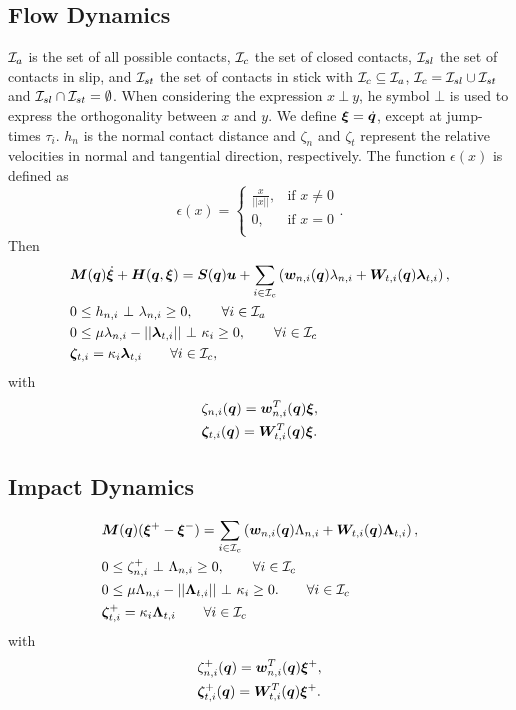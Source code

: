 \documentclass[DC2017114Bouma.tex]{subfiles}
\begin{document}
\subsection*{Flow Dynamics}
$\mathcal{I}_a$ is the set of all possible contacts, $\mathcal{I}_c$ the set of closed contacts, $\mathcal{I}_{sl}$ the set of contacts in slip, and $\mathcal{I}_{st}$ the set of contacts in stick with $\mathcal{I}_c\subseteq \mathcal{I}_a$, $\mathcal{I}_c = \mathcal{I}_{sl}\cup \mathcal{I}_{st}$ and $\mathcal{I}_{sl}\cap \mathcal{I}_{st} = \emptyset$. When considering the expression $x\ \bot\ y$, he symbol $\bot$ is used to express the orthogonality between $x$ and $y$. We define $\boldsymbol{\xi}=\dot{{\boldsymbol{q}}}$, except at jump-times $\tau_i$. $h_n$ is the normal contact distance and $\zeta_{n}$ and $\zeta_{t}$ represent the relative velocities in normal and tangential direction,  respectively. The function $\epsilon(x)$ is defined as 
\begin{equation}
\epsilon(x) = \left\lbrace\begin{array}{rr}
\frac{x}{||x||}, & \text{if } x \neq 0\\
0, & \text{if } x = 0\\
\end{array}\right. .\label{eq:epsilon}
\end{equation}
Then
\begin{align}
&{\boldsymbol{M}}({\boldsymbol{q}})\dot{\boldsymbol{\xi}} + {\boldsymbol{H}}({\boldsymbol{q}},\boldsymbol{\xi}) = {\boldsymbol{S}}({\boldsymbol{q}}){\boldsymbol{u}} + \sum_{i\in\mathcal{I}_c}\left({\boldsymbol{w}}_{n,i}({\boldsymbol{q}})\lambda_{n,i} + {\boldsymbol{W}}_{t,i}({\boldsymbol{q}})\boldsymbol{\lambda}_{t,i} \right), \label{eq:ncpcontact1}\\
&0\leq h_{n,i}\ \bot\ \lambda_{n,i} \geq 0, \qquad \forall i\in\mathcal{I}_a\label{eq:ncpcontact2}\\
&0\leq \mu\lambda_{n,i} - ||\boldsymbol{\lambda}_{t,i}||\ \bot\ \kappa_i \geq 0, \qquad \forall i\in\mathcal{I}_c\label{eq:ncpcontact3}\\
&\boldsymbol{\zeta}_{t,i} = \kappa_i\boldsymbol{\lambda}_{t,i} \qquad \forall i \in \mathcal{I}_c,\label{eq:ncpcontact4}
\end{align}
with 
\begin{align}
&\zeta_{n,i}({\boldsymbol{q}}) = {\boldsymbol{w}}^T_{n,i}({\boldsymbol{q}}) \boldsymbol{\xi},  \label{eq:zetan}\\
&\boldsymbol{\zeta}_{t,i}({\boldsymbol{q}}) = {\boldsymbol{W}}^T_{t,i}({\boldsymbol{q}}) \boldsymbol{\xi}. \label{eq:zetab}
\end{align}
\subsection*{Impact Dynamics}
\begin{align}
&{\boldsymbol{M}}({\boldsymbol{q}})(\boldsymbol{\xi}^+ - \boldsymbol{\xi}^-) = \sum_{i\in\mathcal{I}_c}\left( {\boldsymbol{w}}_{n,i}({\boldsymbol{q}})\Lambda_{n,i} + {\boldsymbol{W}}_{t,i}({\boldsymbol{q}})\boldsymbol{\Lambda}_{t,i}\right), \label{eq:ncpimpact1}\\
&0\leq \zeta_{n,i}^+\ \bot\ \Lambda_{n,i} \geq 0, \qquad \forall i\in\mathcal{I}_c\label{eq:ncpimpact2}\\
&0 \leq \mu\Lambda_{n,i} - ||\boldsymbol{\Lambda}_{t,i}||\ \bot\ \kappa_i \geq 0. \qquad \forall i\in\mathcal{I}_c\label{eq:ncpimpact3}\\
&\boldsymbol{\zeta}_{t,i}^+ = \kappa_i\boldsymbol{\Lambda}_{t,i}\qquad \forall i\in\mathcal{I}_c\label{eq:ncpimpact4}
\end{align}
with 
\begin{align}
&\zeta^+_{n,i}({\boldsymbol{q}}) = {\boldsymbol{w}}^T_{n,i}({\boldsymbol{q}}) \boldsymbol{\xi}^+,\\
&\boldsymbol{\zeta}^+_{t,i}({\boldsymbol{q}}) = {\boldsymbol{W}}^T_{t,i}({\boldsymbol{q}}) \boldsymbol{\xi}^+.\label{eq:ncpimpactend}
\end{align}
\end{document}
